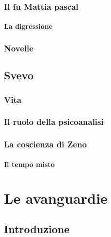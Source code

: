 \documentclass[12pt]{report}
\begin{document}
		\subsection{Il fu Mattia pascal}
			\subsubsection{La digressione}	
		\subsection{Novelle}
	
	\section{Svevo}
		\subsection{Vita}
		\subsection{Il ruolo della psicoanalisi}
		\subsection{La coscienza di Zeno}
			\subsubsection{Il tempo misto}
	
	\chapter{Le avanguardie}
		\section{Introduzione}
\end{document}
